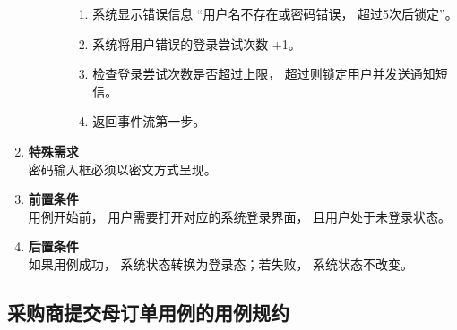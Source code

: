 \begin{enumerate}
\begin{enumerate}
\begin{enumerate}
            \begin{enumerate}
                \item 系统显示错误信息 “用户名不存在或密码错误， 超过5次后锁定”。
                \item 系统将用户错误的登录尝试次数 +1。
                \item 检查登录尝试次数是否超过上限， 超过则锁定用户并发送通知短信。
                \item 返回事件流第一步。
            \end{enumerate}
        \end{enumerate}
    \end{enumerate}
    \item \textbf{特殊需求} \\ 密码输入框必须以密文方式呈现。
    \item \textbf{前置条件} \\ 用例开始前， 用户需要打开对应的系统登录界面， 且用户处于未登录状态。
    \item \textbf{后置条件} \\ 如果用例成功， 系统状态转换为登录态；若失败， 系统状态不改变。
\end{enumerate}


\subsection{采购商提交母订单用例的用例规约}

